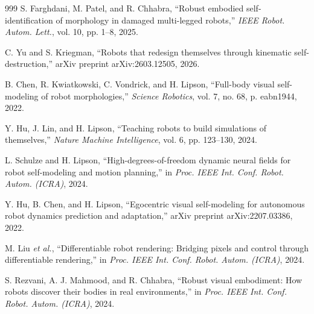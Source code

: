 \documentclass[12pt,a4paper,oneside]{report}
\begin{document}
\begin{thebibliography}{999}
S. Farghdani, M. Patel, and R. Chhabra, ``Robust embodied self-identification of morphology in damaged multi-legged robots,'' \textit{IEEE Robot. Autom. Lett.}, vol. 10, pp. 1--8, 2025.




C. Yu and S. Kriegman, ``Robots that redesign themselves through kinematic self-destruction,'' arXiv preprint arXiv:2603.12505, 2026.





B. Chen, R. Kwiatkowski, C. Vondrick, and H. Lipson, ``Full-body visual self-modeling of robot morphologies,'' \textit{Science Robotics}, vol. 7, no. 68, p. eabn1944, 2022.




Y. Hu, J. Lin, and H. Lipson, ``Teaching robots to build simulations of themselves,'' \textit{Nature Machine Intelligence}, vol. 6, pp. 123--130, 2024.




L. Schulze and H. Lipson, ``High-degrees-of-freedom dynamic neural fields for robot self-modeling and motion planning,'' in \textit{Proc. IEEE Int. Conf. Robot. Autom. (ICRA)}, 2024.




Y. Hu, B. Chen, and H. Lipson, ``Egocentric visual self-modeling for autonomous robot dynamics prediction and adaptation,'' arXiv preprint arXiv:2207.03386, 2022.




M. Liu \textit{et al.}, ``Differentiable robot rendering: Bridging pixels and control through differentiable rendering,'' in \textit{Proc. IEEE Int. Conf. Robot. Autom. (ICRA)}, 2024.




S. Rezvani, A. J. Mahmood, and R. Chhabra, ``Robust visual embodiment: How robots discover their bodies in real environments,'' in \textit{Proc. IEEE Int. Conf. Robot. Autom. (ICRA)}, 2024.





\end{thebibliography}
\end{document}
